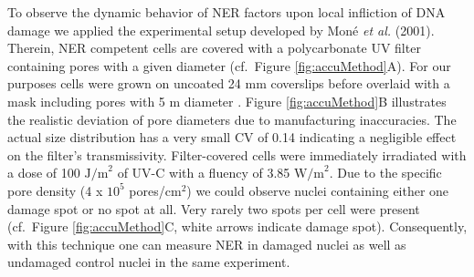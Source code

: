 To observe the dynamic behavior of NER factors upon local infliction of DNA damage we applied the experimental setup developed by Mon\'e \textit{et al.} (2001)\cite{Mone2001}. Therein, NER competent cells are covered with a polycarbonate UV filter containing pores with a given diameter (cf.\ Figure \ref{fig:accuMethod}A). For our purposes cells were grown on uncoated 24 mm coverslips before overlaid with a mask including pores with 5 \textmu m diameter \cite{Verbruggen2014}. Figure \ref{fig:accuMethod}B illustrates the realistic deviation of pore diameters due to manufacturing inaccuracies. The actual size distribution has a very small CV of 0.14 indicating a negligible effect on the filter's transmissivity. Filter-covered cells were immediately irradiated with a dose of 100 $\text{J/m}^\text{2}$ of UV-C with a fluency of 3.85 $\text{W/m}^\text{2}$. Due to the specific pore density (4 x $\text{10}^\text{5}$ pores/$\text{cm}^\text{2}$) we could observe nuclei containing either one damage spot or no spot at all. Very rarely two spots per cell were present (cf.\ Figure \ref{fig:accuMethod}C, white arrows indicate damage spot). Consequently, with this technique one can measure NER in damaged nuclei as well as undamaged control nuclei in the same experiment.



